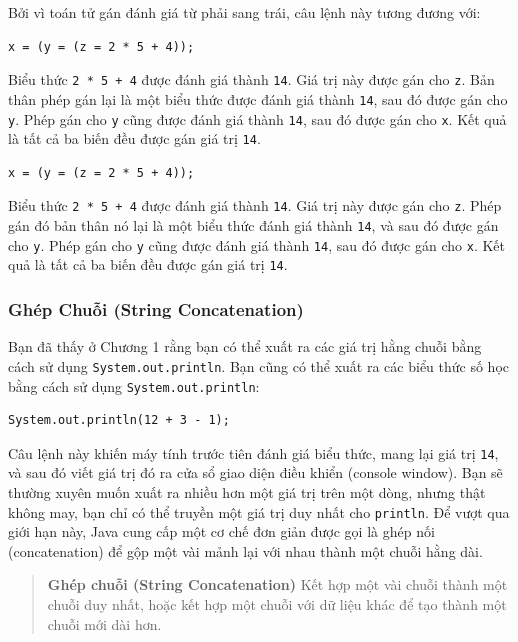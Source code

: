 Bởi vì toán tử gán đánh giá từ phải sang trái, câu lệnh này tương đương
với:

\begin{verbatim}
x = (y = (z = 2 * 5 + 4));
\end{verbatim}

Biểu thức \texttt{2\ *\ 5\ +\ 4} được đánh giá thành \texttt{14}. Giá
trị này được gán cho \texttt{z}. Bản thân phép gán lại là một biểu thức
được đánh giá thành \texttt{14}, sau đó được gán cho \texttt{y}. Phép
gán cho \texttt{y} cũng được đánh giá thành \texttt{14}, sau đó được gán
cho \texttt{x}. Kết quả là tất cả ba biến đều được gán giá trị
\texttt{14}.

\begin{verbatim}
x = (y = (z = 2 * 5 + 4));
\end{verbatim}

Biểu thức \texttt{2\ *\ 5\ +\ 4} được đánh giá thành \texttt{14}. Giá
trị này được gán cho \texttt{z}. Phép gán đó bản thân nó lại là một biểu
thức đánh giá thành \texttt{14}, và sau đó được gán cho \texttt{y}. Phép
gán cho \texttt{y} cũng được đánh giá thành \texttt{14}, sau đó được gán
cho \texttt{x}. Kết quả là tất cả ba biến đều được gán giá trị
\texttt{14}.

\subsubsection{Ghép Chuỗi (String
Concatenation)}\label{ghuxe9p-chuux1ed7i-string-concatenation}

Bạn đã thấy ở Chương 1 rằng bạn có thể xuất ra các giá trị hằng chuỗi
bằng cách sử dụng \texttt{System.out.println}. Bạn cũng có thể xuất ra
các biểu thức số học bằng cách sử dụng \texttt{System.out.println}:

\begin{verbatim}
System.out.println(12 + 3 - 1);
\end{verbatim}

Câu lệnh này khiến máy tính trước tiên đánh giá biểu thức, mang lại giá
trị \texttt{14}, và sau đó viết giá trị đó ra cửa sổ giao diện điều
khiển (console window). Bạn sẽ thường xuyên muốn xuất ra nhiều hơn một
giá trị trên một dòng, nhưng thật không may, bạn chỉ có thể truyền một
giá trị duy nhất cho \texttt{println}. Để vượt qua giới hạn này, Java
cung cấp một cơ chế đơn giản được gọi là ghép nối (concatenation) để gộp
một vài mảnh lại với nhau thành một chuỗi hằng dài.

\begin{quote}
\textbf{Ghép chuỗi (String Concatenation)} Kết hợp một vài chuỗi thành
một chuỗi duy nhất, hoặc kết hợp một chuỗi với dữ liệu khác để tạo thành
một chuỗi mới dài hơn.
\end{quote}

